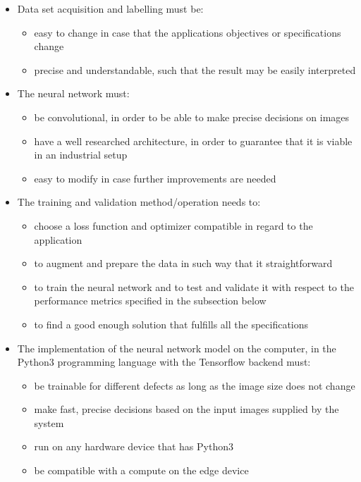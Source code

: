 \documentclass[12pt,a4paper,twoside]{report}
\begin{document}
\begin{itemize}
    \item Data set acquisition and labelling must be:
    \begin{itemize}
        \item easy to change in case that the applications objectives or specifications change
        \item precise and understandable, such that the result may be easily interpreted
    \end{itemize}
    \item The neural network must:
       \begin{itemize}
           \item be convolutional, in order to be able to make precise decisions on images
           \item have a well researched architecture, in order to guarantee that it is viable in an industrial setup
           \item easy to modify in case further improvements are needed
       \end{itemize}
    \item The training and validation method/operation needs to:
       \begin{itemize}
           \item choose a loss function and optimizer compatible in regard to the application
           \item to augment and prepare the data in such way that it straightforward
           \item to train the neural network and to test and validate it with respect to the performance metrics specified in the subsection below
           \item to find a good enough solution that fulfills all the specifications
       \end{itemize}
    \item The implementation of the neural network model on the computer, in the Python3 programming language with the Tensorflow backend must:
    \begin{itemize}
        \item be trainable for different defects as long as the image size does not change
        \item make fast, precise decisions based on the input images supplied by the system
        \item run on any hardware device that has Python3 
        \item be compatible with a compute on the edge device
    \end{itemize}
\end{itemize}
\end{document}
